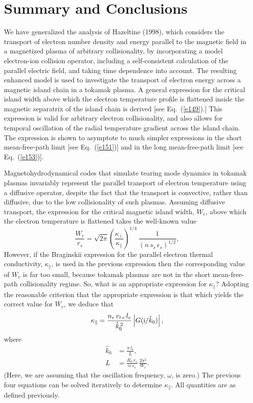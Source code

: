 \documentclass[12pt,prb,aps]{revtex4-1}
\begin{document}
\section{Summary and Conclusions}
We have generalized the analysis of Hazeltine (1998), which considers the transport of electron number density and energy parallel to the magnetic
field in a magnetized plasma of arbitrary collisionality,  by  incorporating a model electron-ion collision operator,
 including a self-consistent calculation of the parallel electric field, and taking time dependence into account. The resulting enhanced model is
 used to investigate the transport of electron energy across a magnetic island chain in a tokamak plasma. A general expression for the critical
 island width above which the electron temperature profile is flattened inside the magnetic separatrix of the island chain is derived [see Eq.~(\ref{e149}).]
 This expression is valid for arbitrary electron collisionality, and also allows for temporal oscillation of the radial temperature gradient across the island chain. 
 The expression is shown to asymptote to much simpler expressions in the short mean-free-path limit [see Eq.~(\ref{e151})] and in the long mean-free-path limit [see
 Eq.~(\ref{e153})]. 
 
 Magnetohydrodynamical  codes that simulate tearing mode dynamics in tokamak plasmas invariably represent the parallel transport of electron temperature using a diffusive operator, despite the
 fact that the transport is convective, rather than diffusive, due to the low collisionality of such plasmas. Assuming diffusive transport, the expression for the critical magnetic island width, $W_c$,  above which the electron temperature is flattened takes the well-known value\,\cite{rf}
\begin{equation}
  \frac{W_{c}}{r_s} =
\sqrt{2\pi}\left(\frac{\kappa_\perp}{\kappa_{\parallel}}\right)^{1/4}\,\frac{1}{(n\,s_s\,\epsilon_s)^{1/2}},
\end{equation}
However, if the  Braginskii expression for the parallel electron thermal conductivity,\cite{brag} $\kappa_\parallel$, is used in the previous expression then the corresponding value of
$W_c$ is far too small, because tokamak plasmas are not in the short mean-free-path collisionality regime. So, what is an appropriate expression for 
$\kappa_\parallel$? Adopting the reasonable criterion that the appropriate expression is that which yields the correct value for $W_c$, 
 we deduce that
\begin{equation}
\kappa_\parallel = \frac{n_e\,v_{t\,e}\,l_e}{\hat{k}_0^{\,2}}\left|G({\rm i}/\hat{k}_0)\right|,
\end{equation}
where
\begin{align}
\hat{k}_0 & = \frac{\pi\,l_e}{L},\\[0.5ex]
L &= \frac{R_0\,r_s}{n\,s_s}\,\frac{2\pi^2}{W_c}.
\end{align}
(Here, we are assuming that the oscillation frequency, $\omega$, is zero.)
The previous four equations can be solved iteratively to determine $\kappa_\parallel$. All quantities are as defined  previously. 
\end{document}
